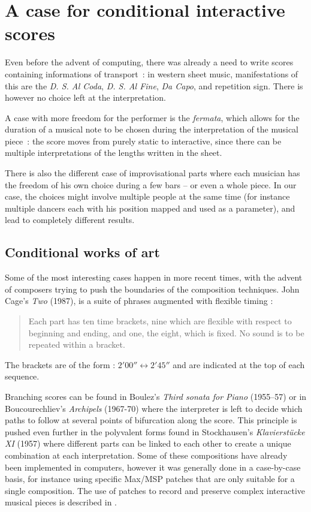 \documentclass{article}
\newcommand{\klavierstuck}{\emph{Klavierstücke XI}}
\begin{document}
	\section{A case for conditional interactive scores}
	Even before the advent of computing, there was already a need to write scores containing informations of transport~: in western sheet music, manifestations of this are the \emph{D. S. Al Coda}, \emph{D. S. Al Fine}, \emph{Da Capo}, and repetition sign. There is however no choice left at the interpretation. 
	
	A case with more freedom for the performer is the \textit{fermata}, which allows for the duration of a musical note to be chosen during the interpretation of the musical piece~: the score moves from purely static to interactive, since there can be multiple interpretations of the lengths written in the sheet.
	
	There is also the different case of improvisational parts where each musician has the freedom of his own choice during a few bars -- or even a whole piece. In our case, the choices might involve multiple people at the same time (for instance multiple dancers each with his position mapped and used as a parameter), and lead to completely different results.
		
	\subsection{Conditional works of art}
	\label{section.examples}
	Some of the most interesting cases happen in more recent times, with the advent of composers trying to push the boundaries of the composition techniques.
	John Cage's \emph{Two} (1987), is a suite of phrases augmented with flexible timing : \blockquote{Each part has ten time brackets, nine which are flexible with respect to beginning and ending, and one, the eight, which is fixed. No sound is to be repeated within a bracket.}. The brackets are of the form : $2'00'' \leftrightarrow 2'45''$ and are indicated at the top of each sequence.
	
	Branching scores can be found in Boulez's \emph{Third sonata for Piano} (1955–57) or in Boucourechliev's \emph{Archipels} (1967-70) where the interpreter is left to decide which paths to follow at several points of bifurcation along the score.
    This principle is pushed even further in the polyvalent forms found in Stockhausen's \klavierstuck{} (1957) where different parts can be linked to each other to create a unique combination at each interpretation.
    Some of these compositions have already been implemented in computers, however it was generally done in a case-by-case basis, for instance using specific Max/MSP patches that are only suitable for a single composition. The use of patches to record and preserve complex interactive musical pieces is described in \cite{bonardi2007patch}.
    
\end{document}
